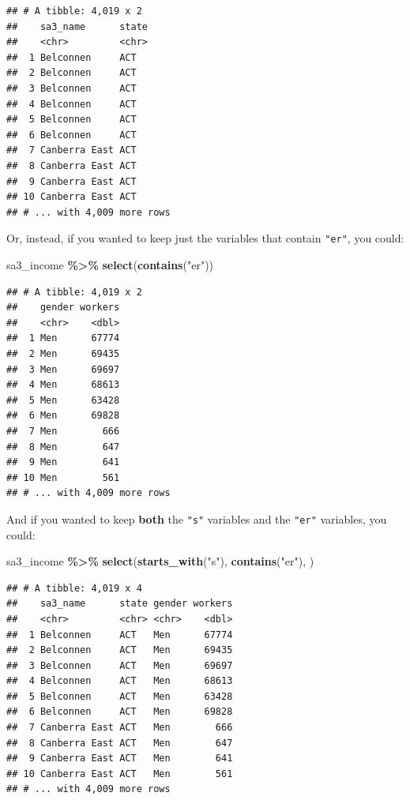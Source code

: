 \documentclass[
]{book}
\newenvironment{Shaded}{\begin{snugshade}}{\end{snugshade}}
\newcommand{\KeywordTok}[1]{\textcolor[rgb]{0.13,0.29,0.53}{\textbf{#1}}}
\newcommand{\NormalTok}[1]{#1}
\newcommand{\OperatorTok}[1]{\textcolor[rgb]{0.81,0.36,0.00}{\textbf{#1}}}
\newcommand{\StringTok}[1]{\textcolor[rgb]{0.31,0.60,0.02}{#1}}
\begin{document}
\begin{verbatim}
## # A tibble: 4,019 x 2
##    sa3_name      state
##    <chr>         <chr>
##  1 Belconnen     ACT  
##  2 Belconnen     ACT  
##  3 Belconnen     ACT  
##  4 Belconnen     ACT  
##  5 Belconnen     ACT  
##  6 Belconnen     ACT  
##  7 Canberra East ACT  
##  8 Canberra East ACT  
##  9 Canberra East ACT  
## 10 Canberra East ACT  
## # ... with 4,009 more rows
\end{verbatim}

Or, instead, if you wanted to keep just the variables that contain \texttt{"er"}, you could:

\begin{Shaded}
\begin{Highlighting}[]
\NormalTok{sa3\_income }\OperatorTok{\%\textgreater{}\%}\StringTok{ }
\StringTok{  }\KeywordTok{select}\NormalTok{(}\KeywordTok{contains}\NormalTok{(}\StringTok{"er"}\NormalTok{))}
\end{Highlighting}
\end{Shaded}

\begin{verbatim}
## # A tibble: 4,019 x 2
##    gender workers
##    <chr>    <dbl>
##  1 Men      67774
##  2 Men      69435
##  3 Men      69697
##  4 Men      68613
##  5 Men      63428
##  6 Men      69828
##  7 Men        666
##  8 Men        647
##  9 Men        641
## 10 Men        561
## # ... with 4,009 more rows
\end{verbatim}

And if you wanted to keep \textbf{both} the \texttt{"s"} variables and the \texttt{"er"} variables, you could:

\begin{Shaded}
\begin{Highlighting}[]
\NormalTok{sa3\_income }\OperatorTok{\%\textgreater{}\%}\StringTok{ }
\StringTok{  }\KeywordTok{select}\NormalTok{(}\KeywordTok{starts\_with}\NormalTok{(}\StringTok{"s"}\NormalTok{), }\KeywordTok{contains}\NormalTok{(}\StringTok{"er"}\NormalTok{), )}
\end{Highlighting}
\end{Shaded}

\begin{verbatim}
## # A tibble: 4,019 x 4
##    sa3_name      state gender workers
##    <chr>         <chr> <chr>    <dbl>
##  1 Belconnen     ACT   Men      67774
##  2 Belconnen     ACT   Men      69435
##  3 Belconnen     ACT   Men      69697
##  4 Belconnen     ACT   Men      68613
##  5 Belconnen     ACT   Men      63428
##  6 Belconnen     ACT   Men      69828
##  7 Canberra East ACT   Men        666
##  8 Canberra East ACT   Men        647
##  9 Canberra East ACT   Men        641
## 10 Canberra East ACT   Men        561
## # ... with 4,009 more rows
\end{verbatim}
\end{document}
